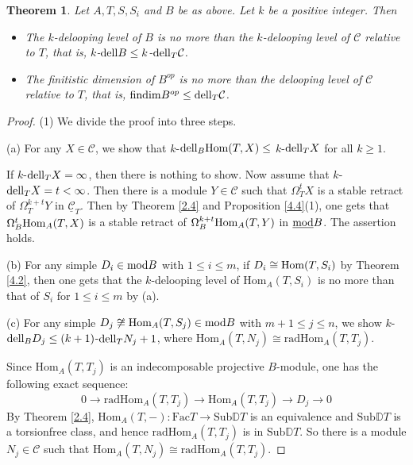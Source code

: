 \documentclass[a4paper]{amsart}
\newtheorem{thm}{Theorem}[section]
\theoremstyle{definition}
\theoremstyle{remark}
\numberwithin{equation}{section}
\begin{document}
\begin{thm}\label{4.5}
   Let $A, T, S, S_i$ and $ B$ be as above. Let $k$ be a positive integer. Then
\begin{itemize}
    \item
    [(1)] The $k$-delooping level of $B$ is no more than the $k$-delooping level of $\mathcal{C}$ relative to $T$, that is, $k$-${\rm dell}B\leq k$-${\rm dell}_T\mathcal{C}$.
    \item
    [(2)] The finitistic dimension of $B^{op}$ is no more than the delooping level of $\mathcal{C}$ relative to $T$, that is, ${\rm findim}B^{op}\leq {\rm dell}_T \mathcal{C}$.
\end{itemize}
\end{thm}

\begin{proof} (1) We divide the proof into three steps.

(a) For any $X\in \mathcal{C}$, we show that  $k$-${\rm dell}_B {\rm Hom}(T, X)\leq $ $k$-${\rm dell}_T X$ for all $k\geq 1$.

If $k$-${\rm dell}_T X=\infty$, then there is nothing to show. Now assume that $k$-${\rm dell}_T X=t<\infty$. Then there is a module $Y\in\mathcal{C}$ such that $\Omega^{t}_T X$ is a stable retract of $\Omega^{k+t}_T Y$ in $\underline{\mathcal{C}}_T$. Then by Theorem \ref{2.4} and Proposition \ref{4.4}(1), one gets that $\Omega^{t}_B {\rm Hom}_A(T, X)$ is a stable retract of $\Omega^{k+t}_B {\rm Hom}_A(T, Y)$ in $\underline{\rm{mod}}B$. The assertion holds.

(b) For any simple $D_i \in{\rm mod} B$ with $1\leq i\leq m$, if $ D_i\cong {\rm Hom}(T, S_i)$ by Theorem \ref{4.2}, then one gets that
the $k$-delooping level of $\text{Hom}_A(T, S_i)$ is no more than that of $S_i$ for $1\leq i\leq m$ by (a).

(c)  For any simple $D_j \not\cong {\rm Hom}_A(T, S_j)\in{\rm mod} B$ with $m+1\leq j\leq n$, we show $k$-${\rm dell}_B D_j\leq (k+1)$-${\rm dell}_T N_j +1$, where $\text{Hom}_A(T, N_j)\cong\text{rad}\text{Hom}_A(T,T_j)$.

Since $\text{Hom}_A(T,T_j)$ is an indecomposable projective $B$-module, one has the following exact sequence:
$$0\rightarrow \text{rad}\text{Hom}_A(T,T_j)\to \text{Hom}_A(T,T_j)\to D_j\to 0 $$
By Theorem \ref{2.4}, $\text{Hom}_A(T,-): \text{Fac}T\to\text{Sub}\mathbb{D}T$ is an equivalence and $\text{Sub}\mathbb{D}T$ is a torsionfree class,
and hence $\text{rad}\text{Hom}_A(T,T_j)$ is in $\text{Sub}\mathbb{D}T$. So there is a module $N_j\in\mathcal{C}$ such that $\text{Hom}_A(T, N_j)\cong\text{rad}\text{Hom}_A(T,T_j)$.


\end{proof}
\end{document}
